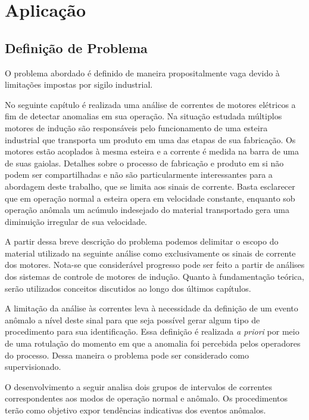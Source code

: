 \chapter{Aplicação}
\label{chap:aplicacoes}

\section{Definição de Problema}

O problema abordado é definido de maneira propositalmente vaga devido à
limitações impostas por sigilo industrial.

No seguinte capítulo é realizada uma análise de correntes de motores elétricos
a fim de detectar anomalias em sua operação. Na situação estudada múltiplos
motores de indução são responsáveis pelo funcionamento de uma esteira
industrial que transporta um produto em uma das etapas de sua fabricação. Os
motores estão acoplados à mesma esteira e a corrente é medida na barra de uma
de suas gaiolas. Detalhes sobre o processo de fabricação e produto em si não
podem ser compartilhadas e não são particularmente interessantes para a
abordagem deste trabalho, que se limita aos sinais de corrente. Basta
esclarecer que em operação normal a esteira opera em velocidade constante,
enquanto sob operação anômala um acúmulo indesejado do material transportado
gera uma diminuição irregular de sua velocidade.

A partir dessa breve descrição do problema podemos delimitar o escopo do
material utilizado na seguinte análise como exclusivamente os sinais de
corrente dos motores. Nota-se que considerável progresso pode ser feito a
partir de análises dos sistemas de controle de motores de indução. Quanto à
fundamentação teórica, serão utilizados conceitos discutidos ao longo dos
últimos capítulos.

A limitação da análise às correntes leva à necessidade da definição de um
evento anômalo a nível deste sinal para que seja possível gerar algum tipo de
procedimento para sua identificação. Essa definição é realizada \emph{a priori}
por meio de uma rotulação do momento em que a anomalia foi percebida pelos
operadores do processo. Dessa maneira o problema pode ser considerado como
supervisionado.

O desenvolvimento a seguir analisa dois grupos de intervalos de correntes
correspondentes aos modos de operação normal e anômalo. Os procedimentos
terão como objetivo expor tendências indicativas dos eventos anômalos.

